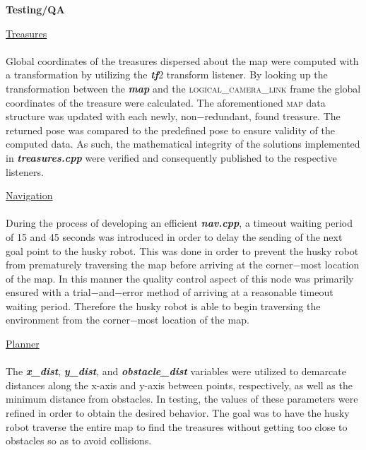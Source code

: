 \documentclass[12pt]{article}
\begin{document}
{\setlength{\parindent}{0cm}
\textbf{Testing/QA}\\
\begin{center}\underline{Treasures}\end{center}
\paragraph{}Global coordinates of the treasures dispersed about the map were computed with a transformation by utilizing the \textbf{\textit{tf}}2 transform listener. By looking up the transformation between the \textbf{\textit{map}} and the \textsc{logical\_camera\_link} frame the global coordinates of the treasure were calculated. 
  The aforementioned \textsc{map} data structure was updated with each newly, non$-$redundant, found treasure. The returned pose was compared to the predefined pose to ensure validity of the computed data. As such, the mathematical integrity of the solutions implemented in \textbf{\textit{treasures.cpp}} were verified and consequently published to the respective listeners. 
\begin{center}\underline{Navigation}\end{center}
\paragraph{}During the process of developing an efficient \textit{\textbf{nav.cpp}}, a timeout waiting period of 15 and 45 seconds was introduced in order to delay the sending of the next goal point to the husky robot. This was done in order to prevent the husky robot from prematurely traversing the map before arriving at the corner$-$most location of the map.
  In this manner the quality control aspect of this node was primarily ensured with a trial$-$and$-$error method of arriving at a reasonable timeout waiting period. Therefore the husky robot is able to begin traversing the environment from the corner$-$most location of the map.  
\begin{center}\underline{Planner}\end{center}
\paragraph{}The \textbf{\textit{x\_dist}}, \textbf{\textit{y\_dist}}, and \textbf{\textit{obstacle\_dist}} variables were utilized to demarcate distances along the x-axis and y-axis between points, respectively, as well as the minimum distance from obstacles. In testing, the values of these parameters were refined in order to obtain the desired behavior. The goal was to have the husky robot traverse the entire map to find the treasures without getting too close to obstacles so as to avoid  collisions.
\\\\ 
}
\end{document}
